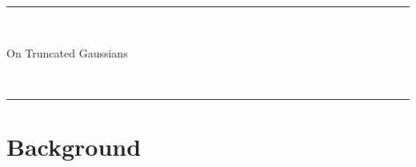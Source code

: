 \documentclass[a4paper]{article}
\theoremstyle{definition}
\begin{document}
\fancyhead[C]{}
\hrule \medskip
\begin{minipage}{0.295\textwidth}
    \raggedright
    \hfill\\
\end{minipage}
\begin{minipage}{0.4\textwidth}
    \centering
    \large
    On Truncated Gaussians\\
\end{minipage}
\begin{minipage}{0.295\textwidth}
    \raggedleft
    \hfill\\
\end{minipage}
\medskip\hrule
\bigskip
 
\section*{Background}
\end{document}
